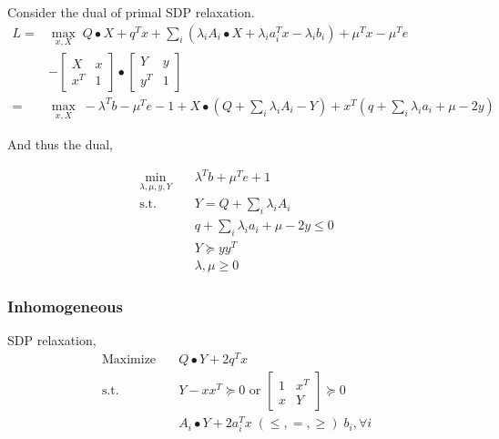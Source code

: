 \documentclass[../main]{subfiles}
\begin{document}
Consider the dual of primal SDP relaxation.
\begin{equation}
  \begin{aligned}
    L = & \max_{x, X} \; Q\bullet X + q^Tx + \sum_i \left( \lambda_i A_i \bullet X  + \lambda_i a_i^Tx - \lambda_i b_i \right ) + \mu^Tx - \mu^Te \\
        & - \begin{bmatrix}X & x \\ x^T & 1\end{bmatrix} \bullet \begin{bmatrix}Y & y \\ y^T & 1\end{bmatrix}                                                                           \\
    =   & \max_{x, X} \; - \lambda^Tb - \mu^Te - 1+X\bullet (Q + \sum_i\lambda_iA_i - Y) + x^T(q + \sum_i \lambda_i a_i + \mu - 2 y)
  \end{aligned}
\end{equation}

And thus the dual,

\begin{equation}
  \begin{aligned}
    \min_{\lambda, \mu, y, Y}\quad & \lambda^Tb + \mu^Te + 1                    \\
    \mathrm{s.t.} \quad            & Y = Q + \sum_i \lambda_i A_i               \\
                                   & q + \sum_i \lambda_i a_i + \mu - 2 y \le 0 \\
                                   & Y \succeq yy^T                             \\
                                   & \lambda, \mu \ge 0
  \end{aligned}
\end{equation}
\subsubsection{Inhomogeneous}
SDP relaxation,
\begin{equation}
  \begin{aligned}
    \mathrm{Maximize}\quad & Q\bullet Y   + 2q^T x                                             \\
    \mathrm{s.t.}  \quad   & Y-xx^T \succeq 0 \text { or }\begin{bmatrix} 1 & x^{T} \\ x & Y \end{bmatrix} \succeq 0 \\
                           & A_i \bullet Y +2 a_i^Tx \; (\le, =, \ge) \; b_i, \forall i        \\
  \end{aligned}
\end{equation}
\end{document}
